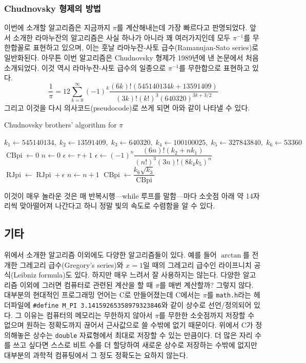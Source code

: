 \documentclass[10pt]{article}
\newcommand{\opn}{\operatorname}
\begin{document}
\subsubsection{Chudnovsky 형제의 방법}
이번에 소개할 알고리즘은 지금까지 $\pi$를 계산해내는데 가장 빠르다고 판명되었다. 앞서 소개한 라마누잔의 알고리즘은 사실 하나가 아니라 꽤 여러가지인데 모두 $\pi^{-1}$를 무한합꼴로 표현하고 있으며, 이는 훗날 라마누잔-사토 급수(Ramanujan-Sato series)로 일반화된다. 아무튼 이번 알고리즘은 Chudnovsky 형제가 1989년에 낸 논문\cite{chudnovsky}에서 처음 소개되었다. 이것 역시 라마누잔-사토 급수의 일종으로 $\pi^{-1}$를 무한합으로 표현하고 있다.
$$
  \dfrac{1}{\pi} = 12\sum_{k=0}^{\infty} \left(-1\right)^{k}\dfrac{\left(6k\right)!\left(545140134k + 13591409\right)}{\left(3k\right)!\left(k!\right)^{3}\left(640320\right)^{3k+3/2}}
$$
그리고 이것을 다시 의사코드(pseudocode)로 쓰게 되면 아와 같이 나타낼 수 있다.
\begin{algorithm}
  \caption{Chudnovsky brothers' algorithm for $\pi$}
  \begin{algorithmic}[1]
  \label{CBpi}
    \State $k_{1} \gets 545140134,\; k_{2} \gets 13591409,\; k_{3} \gets 640320, \; k_{4}\gets 100100025, \; k_{5} \gets 327843840, \; k_{6} \gets 53360 $
    \State $\opn{CBpi} \gets 0$
    \State $n \gets 0$
    \State $\epsilon \gets \tau + 1$
    \While{$\epsilon > \tau$}
      \State $\epsilon \gets \left(-1\right)^{n}\dfrac{\left(6n\right)!\left(k_{2}+nk_{1}\right)}{\left(n!\right)^{3}\left(3n\right)!\left(8k_{4}k_{5}\right)^{n}}$
      \State $\opn{RJpi} \gets \opn{RJpi} + \epsilon$
      \State $n \gets n + 1$
    \EndWhile
    \State $\opn{CBpi} \gets \dfrac{k_{6}\sqrt{k_{3}}}{\opn{CBpi}}$ 
  \EndProcedure
  \end{algorithmic}
\end{algorithm}
이것이 매우 놀라운 것은 매 반복시행---while 루프를 말함---마다 소숫점 아래 약 14자리씩 맞아떨어져 나간다고 하니 정말 빛의 속도로 수렴함을 알 수 있다. 

\pagebreak
\subsection{기타}
위에서 소개한 알고리즘 이외에도 다양한 알고리즘들이 있다. 예를 들어 $\arctan$를 전개한 그레고리 급수(Gregory's series)와 $x=1$일 때의 그레고리 급수인 라이프니치 공식(Leibniz formula)도 있다. 하지만 매우 느려서 잘 사용하지는 않는다. 다양한 알고리즘 이외에 그러면 컴퓨터로 관련된 계산을 할 때 $\pi$를 매번 계산할까? 그렇지 않다. 대부분의 현대적인 프로그래밍 언어는 C로 만들어졌는데 C에서는 $\pi$를 \texttt{math.h}라는 헤더파일에 \texttt{\#define M\_PI 3.14159265358979323846}와 같이 상수로 선언/정의되어 있다. 그 이유는 컴퓨터의 메모리는 무한하지 않아서 $\pi$를 무한한 소숫점까지 저장할 수 없으며 원하는 정확도까지 끊어서 근사값으로 쓸 수밖에 없기 때문이다. 위에서 C가 정의해놓은 상수는 \texttt{double} 자료형에서 최대로 저장할 수 있는 만큼이다. 더 많은 자리 수를 쓰고 싶다면 스스로 비트 수를 더 할당하여 새로운 상수로 저장하는 수밖에 없지만 대부분의 과학적 컴퓨팅에서 그 정도 정확도는 요하지 않는다.
\end{document}
